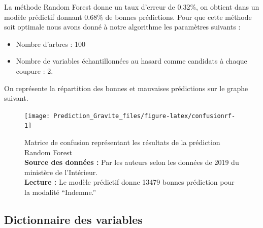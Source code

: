 \documentclass[french,]{tp}
\providecommand{\tightlist}{%
  \setlength{\itemsep}{0pt}\setlength{\parskip}{0pt}}
\begin{document}
La méthode Random Forest donne un taux d'erreur de 0.32\%, on obtient dans un modèle prédictif donnant 0.68\% de bonnes prédictions. Pour que cette méthode soit optimale nous avons donné à notre algorithme les paramètres suivants :

\begin{itemize}
\tightlist
\item
  Nombre d'arbres : 100\\
\item
  Nombre de variables échantillonnées au hasard comme candidats à chaque coupure : 2.
\end{itemize}

On représente la répartition des bonnes et mauvaises prédictions sur le graphe suivant.

\begin{figure}[ht!]

{\centering \texttt{[image: Prediction\_Gravite\_files/figure-latex/confusionrf-1]} 

}

\caption{Matrice de confusion représentant les résultats de la prédiction Random Forest\\
\textbf{Source des données :} Par les auteurs selon les données de 2019 du ministère de l'Intérieur.\\
\textbf{Lecture :} Le modèle prédictif donne 13479 bonnes prédiction pour la modalité ``Indemne.''}\label{fig:confusionrf}
\end{figure}





\newpage

\hypertarget{dico-var}{%
\subsection{Dictionnaire des variables}\label{dico-var}}
\end{document}
